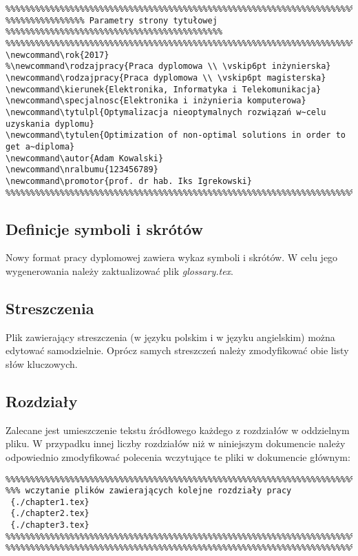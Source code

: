 {\footnotesize \begin{verbatim}
%%%%%%%%%%%%%%%%%%%%%%%%%%%%%%%%%%%%%%%%%%%%%%%%%%%%%%%%%%%%%%%%%%%%%%%%%%%%%%%%%%%%%%%%%
%%%%%%%%%%%%%%%% Parametry strony tytułowej  %%%%%%%%%%%%%%%%%%%%%%%%%%%%%%%%%%%%%%%%%%%%
%%%%%%%%%%%%%%%%%%%%%%%%%%%%%%%%%%%%%%%%%%%%%%%%%%%%%%%%%%%%%%%%%%%%%%%%%%%%%%%%%%%%%%%%%
\newcommand\rok{2017}
%\newcommand\rodzajpracy{Praca dyplomowa \\ \vskip6pt inżynierska}
\newcommand\rodzajpracy{Praca dyplomowa \\ \vskip6pt magisterska}
\newcommand\kierunek{Elektronika, Informatyka i Telekomunikacja}
\newcommand\specjalnosc{Elektronika i inżynieria komputerowa}
\newcommand\tytulpl{Optymalizacja nieoptymalnych rozwiązań w~celu uzyskania dyplomu}
\newcommand\tytulen{Optimization of non-optimal solutions in order to get a~diploma}
\newcommand\autor{Adam Kowalski}
\newcommand\nralbumu{123456789}
\newcommand\promotor{prof. dr hab. Iks Igrekowski}
%%%%%%%%%%%%%%%%%%%%%%%%%%%%%%%%%%%%%%%%%%%%%%%%%%%%%%%%%%%%%%%%%%%%%%%%%%%%%%%%%%%%%%%%%
\end{verbatim}
}

\subsection{Definicje symboli i skrótów}
Nowy format pracy dyplomowej zawiera wykaz symboli i skrótów. W celu jego wygenerowania należy zaktualizować plik \textit{glossary.tex}. 

\subsection{Streszczenia}
Plik zawierający streszczenia (w języku polskim i w języku angielskim)  można edytować samodzielnie. Oprócz samych streszczeń należy zmodyfikować obie listy słów kluczowych.
 
\subsection{Rozdziały}
Zalecane jest umieszczenie tekstu źródłowego każdego z rozdziałów w oddzielnym pliku. W przypadku innej liczby rozdziałów niż w niniejszym dokumencie należy odpowiednio zmodyfikować polecenia  wczytujące te pliki w dokumencie głównym:

{\footnotesize \begin{verbatim}
%%%%%%%%%%%%%%%%%%%%%%%%%%%%%%%%%%%%%%%%%%%%%%%%%%%%%%%%%%%%%%%%%%%%%%%%%%%%%%%%%%%%%%%%%
%%% wczytanie plików zawierających kolejne rozdziały pracy
 {./chapter1.tex}
 {./chapter2.tex}
 {./chapter3.tex}
%%%%%%%%%%%%%%%%%%%%%%%%%%%%%%%%%%%%%%%%%%%%%%%%%%%%%%%%%%%%%%%%%%%%%%%%%%%%%%%%%%%%%%%%%
%%%%%%%%%%%%%%%%%%%%%%%%%%%%%%%%%%%%%%%%%%%%%%%%%%%%%%%%%%%%%%%%%%%%%%%%%%%%%%%%%%%%%%%%%
\end{verbatim}
}


